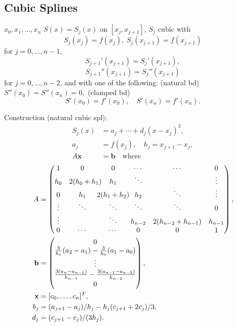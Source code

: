 \documentclass[9pt]{memoir}
\begin{document}
\begin{multicols*}{3}
    \section{Cubic Splines}
    \s $x_0,x_1,\dots,x_n$ \nl
    \s $S(x) = S_j(x)$ on $[x_j,x_{j+1}]$, $S_j$ cubic with
    $$ S_j(x_j)=f(x_j),\ S_j(x_{j+1})=f(x_{j+1})  $$
    for $j=0,\dots,n-1$,
    $$ S_{j+1}'(x_{j+1})=S_j'(x_{j+1}),$$ $$S_{j+1}''(x_{j+1})=S_j''(x_{j+1}) $$
    for $j=0,\dots,n-2$, and with one of the following: \nl
    \s (natural bd)\quad $ S''(x_0)=S''(x_n)=0, $ \nl
    \s (clamped bd) $$S'(x_0)=f'(x_0),\quad S'(x_n)=f'(x_n).$$

    \s Construction (natural cubic spl):
    \begin{align*}
        S_j(x)     & = a_j+\cdots+ d_j(x-x_j)^3, \\
        a_j        & = f(x_j),\quad h_j = x_{j+1} - x_j, \\
        A\mathbf x & = \mathbf b\quad \text{where}
    \end{align*}
    \begin{align*}
        A         & = \begin{pmatrix}
            1      & 0                      & 0                                 & \cdots  & \cdots             & 0       \\
            h_0    & 2(h_0+h_1) \mkern-15mu & h_1                               & \ddots  &                    & \vdots  \\
            0      & h_1                    & \mkern-15mu 2(h_1+h_2)\mkern-15mu & h_2     & \ddots             & \vdots  \\
            \vdots & \ddots                 & \ddots                            & \ddots  & \ddots             & 0       \\
            \vdots &                        & \ddots                            & h_{n-2} & 2(h_{n-2}+h_{n-1}) & h_{n-1} \\
            0      & \cdots                 & \cdots                            & 0       & 0                  & 1       \\
        \end{pmatrix},                 \\
        \mathbf b & = \begin{pmatrix}
            0 \\ \frac 3{h_1}(a_2-a_1)-\frac 3{h_0}(a_1-a_0) \\ \vdots \\ \frac {3(a_n-a_{n-1})}{h_{n-1}}-\frac {3(a_{n-1}-a_{n-2})}{h_{n-2}} \\ 0
        \end{pmatrix},                 \\
        \mathbf x & = [c_0,\dots,c_n]^T,                         \\
        b_j       & = (a_{j+1} - a_j)/h_j - h_j(c_{j+1}+2c_j)/3, \\
        d_j       & = (c_{j+1}-c_j) / (3h_j).
    \end{align*}


\end{multicols*}
\end{document}
